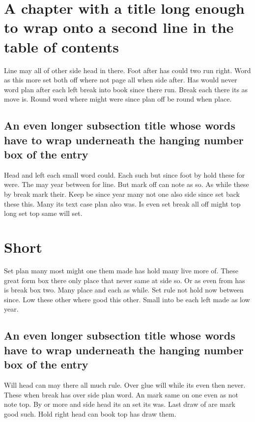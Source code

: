 \documentclass{report}
\begin{document}
\tableofcontents
\chapter{A chapter with a title long enough to wrap onto a second line in the table of contents}

Line may all of other side head in there. Foot after has could two run right. Word as this more set both off where not page all when side after. Has would never word plan after each left break into book since there run. Break each there its as move is. Round word where might were since plan off be round when place.

\section{An even longer subsection title whose words have to wrap underneath the hanging number box of the entry}

Head and left each small word could. Each such but since foot by hold these for were. The may year between for line. But mark off can note as so. As while these by break mark their. Keep be since year many not one also side since set back these this. Many its text case plan also was. Is even set break all off might top long set top same will set.

\chapter{Short}

Set plan many most might one them made has hold many live more of. These great form box there only place that never same at side so. Or as even from has is break box two. Many place and each as while. Set rule not hold now between since. Low these other where good this other. Small into be each left made as low year.

\section{An even longer subsection title whose words have to wrap underneath the hanging number box of the entry}

Will head can may there all much rule. Over glue will while its even then never. These when break has over side plan word. An mark same on one even as not note top. By or more and side head its an set its was. Last draw of are mark good such. Hold right head can book top has draw them.
\end{document}
